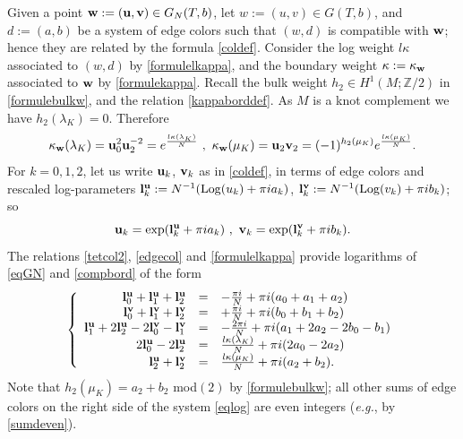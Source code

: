 \documentclass[11pt]{amsart}
\newcommand{\mz}{\mathbb{Z}}
\newcommand{\bw}{{\bf w}}
\newcommand{\bu}{{\bf u}}
\newcommand{\bv}{{\bf v}}
\newcommand{\bl}{{\bf l}}
\newcommand{\Log}{{\rm Log}}
\begin{document}
{Given a point $\bw:=(\bu,\bv)\in G_N(T,b)$, let $w:=(u,v)\in G(T,b)$, and $d:=(a,b)$ be a system of edge colors such that $(w,d)$ is compatible with $\bw$; hence they are related by the formula \eqref{coldef}. Consider the log weight $l\kappa$ associated to $(w,d)$ by \eqref{formulelkappa}, and the boundary weight $\kappa:=\kappa_{\bw}$ associated to $\bw$ by \eqref{formulekappa}. Recall the bulk weight $h_2\in H^1(M; \mz/2)$ in \eqref{formulebulkw}, and the relation \eqref{kappaborddef}. As $M$ is a knot complement we have $h_2(\lambda_K)=0$. Therefore
\begin{equation}\label{compbord}
\kappa_\bw(\lambda_K) = \bu_0^{2}\bu_2^{-2}   = e^{\frac{l\kappa(\lambda_K)}{N}}\ ,\ \kappa_\bw(\mu_K) = \bu_2\bv_2  = (-1)^{h_2(\mu_K)} e^{\frac{l\kappa(\mu_K)}{N}}.
\end{equation}
For $k=0,1,2$, let us write $\bu_k$, $\bv_k$  as in \eqref{coldef}, in terms of edge colors and rescaled log-parameters $\bl_{k}^\bu:=N^{-1}(\Log(u_k)+\pi i a_k)$, $\bl_{k}^\bv:=N^{-1}(\Log(v_k)+\pi i b_k)$; so 
\begin{equation}\label{qshapeuvoct25}
\bu_{k} = \exp(\bl_{k}^\bu+\pi i a_k)\ ,\ \bv_{k} = \exp(\bl_{k}^\bv+ \pi i b_k).
\end{equation}
The relations \eqref{tetcol2}, \eqref{edgecol} and \eqref{formulelkappa} provide logarithms of \eqref{eqGN} and \eqref{compbord} of the form 
\begin{equation}\label{eqlog}
\left\lbrace\begin{array}{rcl}
\bl_{0}^\bu+\bl_{1}^\bu+\bl_{2}^\bu & = &\textstyle -\frac{\pi i}{N}+\pi i(a_0+a_1+a_2)\\
\bl_{0}^\bv+\bl_{1}^\bv+\bl_{2}^\bv & = & \textstyle +\frac{\pi i}{N}+\pi i(b_0+b_1+b_2)\\
\bl_{1}^\bu+2\bl_{2}^\bu-2\bl_{0}^\bv-\bl_{1}^\bv & = & \textstyle -\frac{2\pi i}{N}+\pi i(a_1+2a_2-2b_0-b_1)\\
2\bl_{0}^\bu-2\bl_{2}^\bu & = &\textstyle \frac{l\kappa(\lambda_K)}{N}+\pi i(2a_0-2a_2)\\
\bl_{2}^\bu+\bl_{2}^\bv & = & \textstyle \frac{l\kappa(\mu_K)}{N} +\pi i(a_2+b_2).
\end{array}\right.
\end{equation}
Note that $h_2(\mu_K) = a_2+b_2$ mod$(2)$ by \eqref{formulebulkw}; all other sums of edge colors on the right side of the system \eqref{eqlog} are even integers ({\it e.g.}, by \eqref{sumdeven}). 

}
\end{document}
